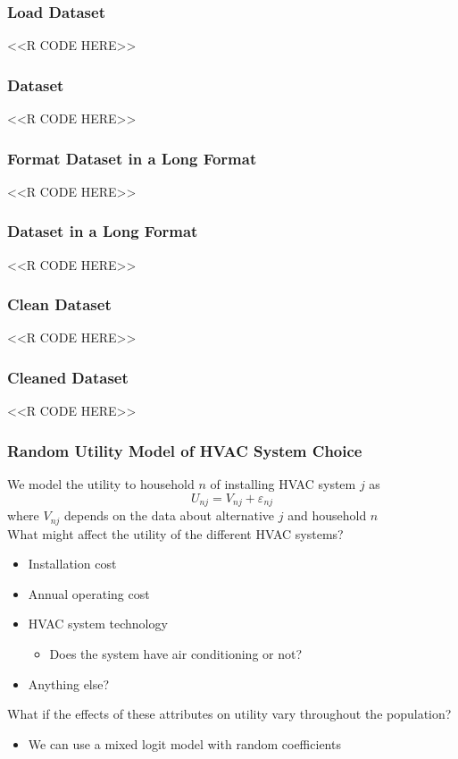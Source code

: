 \documentclass{beamer}
\begin{document}
\begin{frame}[fragile]\frametitle{Load Dataset}
    <<R CODE HERE>>
\end{frame}

\begin{frame}[fragile]\frametitle{Dataset}
    <<R CODE HERE>>
\end{frame}

\begin{frame}[fragile]\frametitle{Format Dataset in a Long Format}
    <<R CODE HERE>>
\end{frame}

\begin{frame}[fragile]\frametitle{Dataset in a Long Format}
    <<R CODE HERE>>
\end{frame}

\begin{frame}[fragile]\frametitle{Clean Dataset}
    <<R CODE HERE>>
\end{frame}

\begin{frame}[fragile]\frametitle{Cleaned Dataset}
    <<R CODE HERE>>
\end{frame}

\begin{frame}\frametitle{Random Utility Model of HVAC System Choice}
    We model the utility to household $n$ of installing HVAC system $j$ as
    $$U_{nj} = V_{nj} + \varepsilon_{nj}$$
    where $V_{nj}$ depends on the data about alternative $j$ and household $n$ \\
    \vspace{2ex}
    What might affect the utility of the different HVAC systems?
	\begin{itemize}
		\item Installation cost
		\item Annual operating cost
		\item HVAC system technology
		\begin{itemize}
			\item Does the system have air conditioning or not?
		\end{itemize}
		\item Anything else?
	\end{itemize}
	\vspace{2ex}
	What if the effects of these attributes on utility vary throughout the population?
	\begin{itemize}
		\item We can use a mixed logit model with random coefficients
	\end{itemize}
\end{frame}
\end{document}
